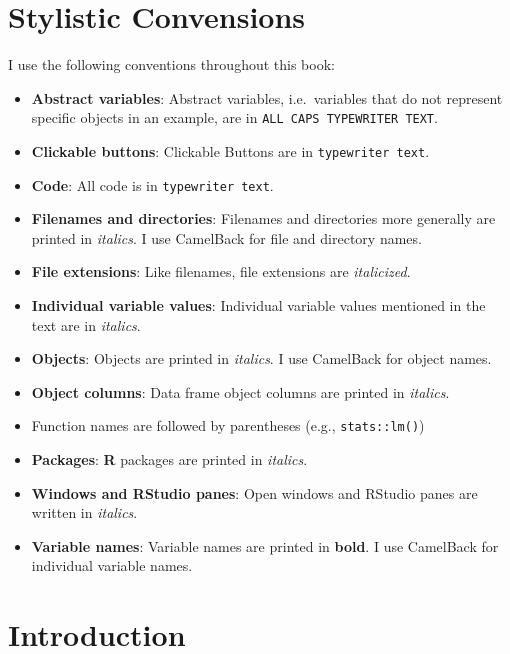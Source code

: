 \documentclass[]{krantz}
\theoremstyle{definition}
\theoremstyle{definition}
\theoremstyle{definition}
\theoremstyle{remark}
\begin{document}
\hypertarget{stylistic-convensions}{%
\chapter*{Stylistic Convensions}\label{stylistic-convensions}}


I use the following conventions throughout this book:

\begin{itemize}
\item
  \textbf{Abstract variables}: Abstract variables, i.e.~variables that
  do not represent specific objects in an example, are in
  \texttt{ALL\ CAPS\ TYPEWRITER\ TEXT}.
\item
  \textbf{Clickable buttons}: Clickable Buttons are in
  \texttt{typewriter\ text}.
\item
  \textbf{Code}: All code is in \texttt{typewriter\ text}.
\item
  \textbf{Filenames and directories}: Filenames and directories more
  generally are printed in \emph{italics}. I use CamelBack for file and
  directory names.
\item
  \textbf{File extensions}: Like filenames, file extensions are
  \emph{italicized}.
\item
  \textbf{Individual variable values}: Individual variable values
  mentioned in the text are in \emph{italics}.
\item
  \textbf{Objects}: Objects are printed in \emph{italics}. I use
  CamelBack for object names.
\item
  \textbf{Object columns}: Data frame object columns are printed in
  \emph{italics}.
\item
  Function names are followed by parentheses (e.g.,
  \texttt{stats::lm()})
\item
  \textbf{Packages}: \textbf{R} packages are printed in \emph{italics}.
\item
  \textbf{Windows and RStudio panes}: Open windows and RStudio panes are
  written in \emph{italics}.
\item
  \textbf{Variable names}: Variable names are printed in \textbf{bold}.
  I use CamelBack for individual variable names.
\end{itemize}

\mainmatter

\hypertarget{introduction}{%
\chapter{Introduction}\label{introduction}}
\end{document}
